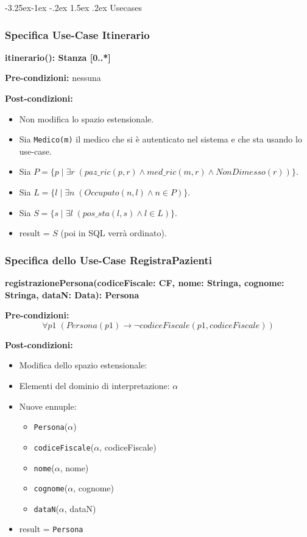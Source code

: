 \documentclass{article}
\makeatletter
\renewcommand\subsection{\@startsection{subsection}{2}{\z@}%
                                     {-3.25ex\@plus-1ex \@minus-.2ex}%
                                     {1.5ex \@plus.2ex}%
                                     {\normalfont\normalsize\bfseries}}
\makeatother
\begin{document}
\newpage

\subsection{Usecases}

\subsubsection{Specifica Use-Case Itinerario}

\textbf{itinerario(): Stanza [0..*]}

\textbf{Pre-condizioni:} nessuna

\textbf{Post-condizioni:}
\begin{itemize}
    \item Non modifica lo spazio estensionale.
    \item Sia \texttt{Medico(m)} il medico che si è autenticato nel sistema e che sta usando lo use-case.
    \item Sia \( P = \{p \mid \exists r \; (paz\_ric(p,r) \land med\_ric(m,r) \land NonDimesso(r))\} \).
    \item Sia \( L = \{l \mid \exists n \; (Occupato(n,l) \land n \in P)\} \).
    \item Sia \( S = \{s \mid \exists l \; (pos\_sta(l,s) \land l \in L)\} \).
    \item result = \( S \) (poi in SQL verrà ordinato).
\end{itemize}

\newpage
\subsubsection{Specifica dello Use-Case RegistraPazienti}

\textbf{registrazionePersona(codiceFiscale: CF, nome: Stringa, cognome: Stringa, dataN: Data): Persona}

\textbf{Pre-condizioni:} 
\[
\forall p1 \; (Persona(p1) \rightarrow \neg codiceFiscale(p1,codiceFiscale))
\]

\textbf{Post-condizioni:}
\begin{itemize}
    \item Modifica dello spazio estensionale:
    \item Elementi del dominio di interpretazione: \( \alpha \)
    \item Nuove ennuple:
    \begin{itemize}
        \item \texttt{Persona}(\(\alpha\))
        \item \texttt{codiceFiscale}(\(\alpha\), codiceFiscale)
        \item \texttt{nome}(\(\alpha\), nome)
        \item \texttt{cognome}(\(\alpha\), cognome)
        \item \texttt{dataN}(\(\alpha\), dataN)
    \end{itemize}
    \item result = \texttt{Persona}
\end{itemize}
\end{document}
